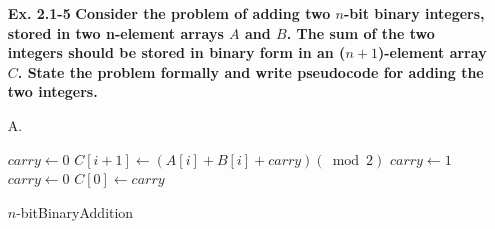 \documentclass[fontsize=12pt,paper=a4,open=any]{book}
\begin{document}
\begin{enumerate}
	\item[\textbf{Ex. 2.1-5}]
		\textbf{Consider the problem of adding two $n$-bit binary integers, stored in two n-element arrays $A$ and $B$. The sum of the two integers should be stored in binary form in an ($n+1$)-element array $C$. State the problem formally and write pseudocode for adding the two integers.}

	\item[A.]
		\begin{algorithm}[H]

			$carry \longleftarrow 0$\;
			{
				$C[i+1] \longleftarrow (A[i] + B[i]+carry) (\bmod 2)$\;
				{
					$carry \longleftarrow 1$\;
				}
				\Else
				{
					$carry \longleftarrow 0$\;
				}
			}
			$C[0] \longleftarrow carry$\;
			\caption{$n$-bitBinaryAddition}
		\end{algorithm}

\end{enumerate}
\end{document}
